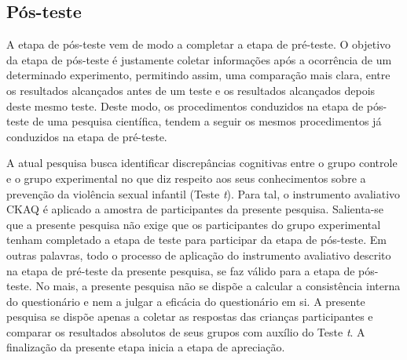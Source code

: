 \subsection{Pós-teste}\label{subsec:posteste}

A etapa de pós-teste vem de modo a completar a etapa de pré-teste. O objetivo da etapa de pós-teste é justamente coletar informações após a ocorrência de um determinado experimento, permitindo assim, uma comparação mais clara, entre os resultados alcançados antes de um teste e os resultados alcançados depois deste mesmo teste. Deste modo, os procedimentos conduzidos na etapa de pós-teste de uma pesquisa científica, tendem a seguir os mesmos procedimentos já conduzidos na etapa de pré-teste. 

A atual pesquisa busca identificar discrepâncias cognitivas entre o grupo controle e o grupo experimental no que diz respeito aos seus conhecimentos sobre a prevenção da violência sexual infantil (Teste \textit{t}). Para tal, o instrumento avaliativo \ac{CKAQ} é aplicado a amostra de participantes da presente pesquisa. Salienta-se que a presente pesquisa não exige que os participantes do grupo experimental tenham completado a etapa de teste para participar da etapa de pós-teste. Em outras palavras, todo o processo de aplicação do instrumento avaliativo descrito na etapa de pré-teste da presente pesquisa, se faz válido para a etapa de pós-teste. No mais, a presente pesquisa não se dispõe a calcular a consistência interna do questionário e nem a julgar a eficácia do questionário em si. A presente pesquisa se dispõe apenas a coletar as respostas das crianças participantes e comparar os resultados absolutos de seus grupos com auxílio do Teste \textit{t}. A finalização da presente etapa inicia a etapa de apreciação.



